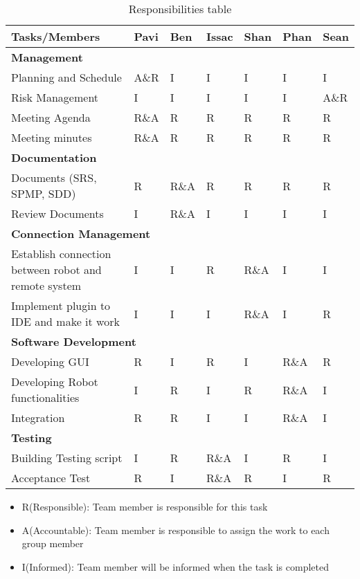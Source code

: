 \begin{table}[]
	\centering
	\caption{Responsibilities table}
	\label{my-label}
	\begin{tabular}{|l|l|l|l|l|l|l|}
		\hline
		Tasks/Members                                        & Pavi & Ben  & Issac & Shan & Phan & Sean \\ \hline
		\multicolumn{7}{|l|}{\textbf{Management}}                                                       \\ \hline
		Planning and Schedule                                & A\&R & I    & I     & I    & I    & I    \\ \hline
		Risk Management                                      & I    & I    & I     & I    & I    & A\&R \\ \hline
		Meeting Agenda                                       & R\&A & R    & R     & R    & R    & R    \\ \hline
		Meeting minutes                                      & R\&A & R    & R     & R    & R    & R    \\ \hline
		\multicolumn{7}{|l|}{\textbf{Documentation}}                                                    \\ \hline
		Documents (SRS, SPMP, SDD)                           & R    & R\&A & R     & R    & R    & R    \\ \hline
		Review Documents                                     & I    & R\&A & I     & I    & I    & I    \\ \hline
		\multicolumn{7}{|l|}{\textbf{Connection Management}}                                            \\ \hline
		Establish connection between robot and remote system & I    & I    & R     & R\&A & I    & I    \\ \hline
		Implement plugin to IDE and make it work             & I    & I    & I     & R\&A & I    & R    \\ \hline
		\multicolumn{7}{|l|}{\textbf{Software Development}}                                             \\ \hline
		Developing GUI                                       & R    & I    & R     & I    & R\&A & R    \\ \hline
		Developing Robot functionalities                     & I    & R    & I     & R    & R\&A & I    \\ \hline
		Integration                                          & R    & R    & I     & I    & R\&A & I    \\ \hline
		\multicolumn{7}{|l|}{\textbf{Testing}}                                                          \\ \hline
		Building Testing script                              & I    & R    & R\&A  & I    & R    & I    \\ \hline
		Acceptance Test                                      & R    & I    & R\&A  & R    & I    & R    \\ \hline
	\end{tabular}
\end{table}
\begin{itemize}
\item R(Responsible): Team member is responsible for this task
\item A(Accountable): Team member is responsible to assign the work to each group member
\item I(Informed): Team member will be informed when the task is completed
\end{itemize}